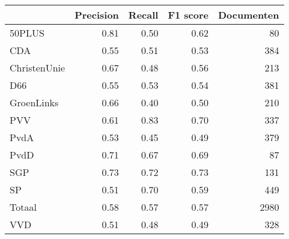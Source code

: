 \begin{tabular}{lrrrr}
\toprule
{} &  Precision &  Recall &  F1 score &  Documenten \\
\midrule
50PLUS       &       0.81 &    0.50 &      0.62 &          80 \\
CDA          &       0.55 &    0.51 &      0.53 &         384 \\
ChristenUnie &       0.67 &    0.48 &      0.56 &         213 \\
D66          &       0.55 &    0.53 &      0.54 &         381 \\
GroenLinks   &       0.66 &    0.40 &      0.50 &         210 \\
PVV          &       0.61 &    0.83 &      0.70 &         337 \\
PvdA         &       0.53 &    0.45 &      0.49 &         379 \\
PvdD         &       0.71 &    0.67 &      0.69 &          87 \\
SGP          &       0.73 &    0.72 &      0.73 &         131 \\
SP           &       0.51 &    0.70 &      0.59 &         449 \\
Totaal       &       0.58 &    0.57 &      0.57 &        2980 \\
VVD          &       0.51 &    0.48 &      0.49 &         328 \\
\bottomrule
\end{tabular}
